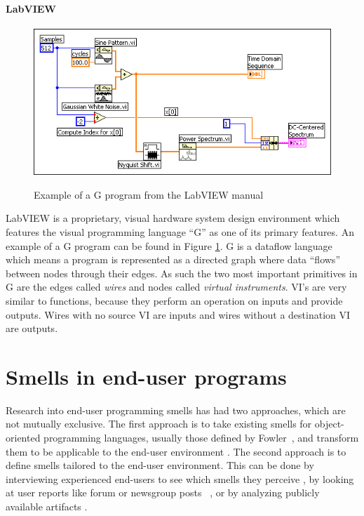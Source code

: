 \documentclass[10pt,conference,compsocconf]{IEEEtran}
\begin{document}
\paragraph{LabVIEW}
\begin{figure}
\caption{Example of a G program from the LabVIEW manual}
\centering
\includegraphics[width=\columnwidth]{labview-1}
\label{fig:labviewexample}
\end{figure}

LabVIEW is a proprietary, visual hardware system design environment which features the visual programming language ``G'' as one of its primary features.
An example of a G program can be found in Figure \ref{fig:labviewexample}.
G is a dataflow language which means a program is represented as a directed graph where data ``flows'' between nodes through their edges.
As such the two most important primitives in G are the edges called \textit{wires} and nodes called \textit{virtual instruments}.
VI's are very similar to functions, because they perform an operation on inputs and provide outputs.
Wires with no source VI are inputs and wires without a destination VI are outputs. 


\section{Smells in end-user programs}
\label{sec:smells}
Research into end-user programming smells has had two approaches, which are not mutually exclusive.
The first approach is to take existing smells for object-oriented programming languages, usually those defined by Fowler~\cite{Fowl1999}, and transform them to be applicable to the end-user environment \cite{Hermans2012inter,Hermans2012intra,Stolee2011,StoleeTSE2013, chambers2013smell}.
The second approach is to define smells tailored to the end-user environment.
This can be done by interviewing experienced end-users to see which smells they perceive \cite{chambers2013smell}, by looking at user reports like forum or newsgroup posts~ \cite{badame2012refactoring,chambers2013smell}, or by analyzing publicly available artifacts \cite{Stolee2011,StoleeTSE2013}.
\end{document}
